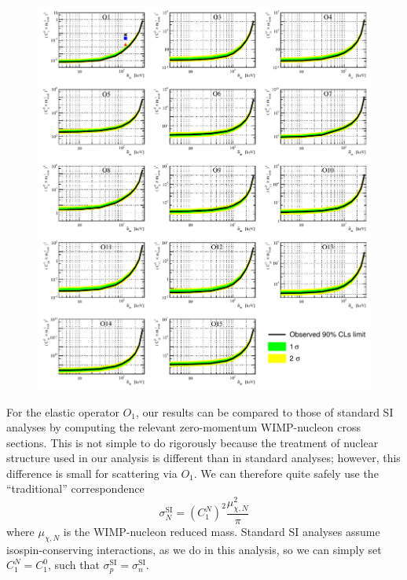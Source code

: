 \begin{figure}
\begin{minipage}{1.\linewidth}
\centerline{\includegraphics[width=\textwidth,height=0.99\textheight,keepaspectratio]{fig/FinalInelastic.pdf}}
\end{minipage}
\label{fig:InelasticLimit}
\end{figure}

For the elastic operator $O_1$, our results can be compared to those of standard SI analyses by computing the relevant zero-momentum WIMP-nucleon cross sections. This is not simple to do rigorously because the treatment of nuclear structure used in our analysis is different than in standard analyses; however, this difference is small for scattering via $O_1$. We can therefore quite safely use the ``traditional'' correspondence~\cite{DeSimone:2016fbz}
%
\begin{equation}
\sigma_{N}^\mathrm{SI} = \left(C^N_1\right)^2 \frac{\mu_{\chi,N}^2}{\pi}
\end{equation}
%
where $\mu_{\chi,N}$ is the WIMP-nucleon reduced mass. Standard SI analyses assume isospin-conserving interactions, as we do in this analysis, so we can simply set $C^N_1 = C^0_1$, such that $\sigma_{p}^\mathrm{SI}=\sigma_{n}^\mathrm{SI}$. 


